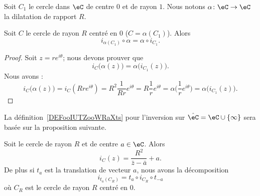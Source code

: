 Soit \( C_1\) le cercle dans \( \eC\) de centre \( 0\) et de rayon \( 1\). Nous notons \( \alpha\colon \eC\to \eC\) la dilatation de rapport \( R\).

\begin{proposition}          \label{PROPooYHQVooVFamhr}
    Soit \( C\) le cercle de rayon \( R\) centré en \( 0\) (\( C=\alpha(C_1)\)). Alors
    \begin{equation}
        i_{\alpha(C_1)}\circ \alpha=\alpha\circ i_{C_1}.
    \end{equation}
\end{proposition}

\begin{proof}
    Soit \( z=r e^{i\theta}\); nous devons prouver que
    \begin{equation}
        i_C\big( \alpha(z) \big)=\alpha\big( i_{C_1}(z) \big).
    \end{equation}
    Nous avons :
    \begin{equation}
            i_C\big( \alpha(z) \big)=i_C(Rr e^{i\theta})=R^2\frac{1}{ Rr } e^{i\theta}=R\frac{1}{ r } e^{i\theta}=\alpha\big( \frac{1}{ r } e^{i\theta} \big)=\alpha\big( i_{C_1}(z) \big).
    \end{equation}
\end{proof}

La définition~\ref{DEFooIUTZooWRaXts} pour l'inversion sur \( \hat \eC=\eC\cup\{ \infty \}\) sera basée sur la proposition suivante.
\begin{proposition}      \label{PROPooEWXNooNshvHq}
    Soit le cercle de rayon \( R\) et de centre \( a\in \eC\). Alors
    \begin{equation}        \label{EQooEQEFooHtJuje}
        i_C(z)=\frac{ R^2 }{ \bar z-\bar a }+a.
    \end{equation}
    De plus si \( t_a\) est la translation de vecteur \( a\), nous avons la décomposition
    \begin{equation}
        i_{t_a(C_R)}=t_a\circ i_{C_R}\circ t_{-a}
    \end{equation}
    où \( C_R\) est le cercle de rayon \( R\) centré en \( 0\).
\end{proposition}

